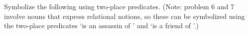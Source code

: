 %
%

\practiceproblems

\problempart Symbolize the following using two-place predicates.  (Note: problem 6 and 7 involve nouns that express relational notions, so these can be symbolized using the two-place predicates `\blank is an assassin of \blank' and `\blank is a friend of \blank'.)

